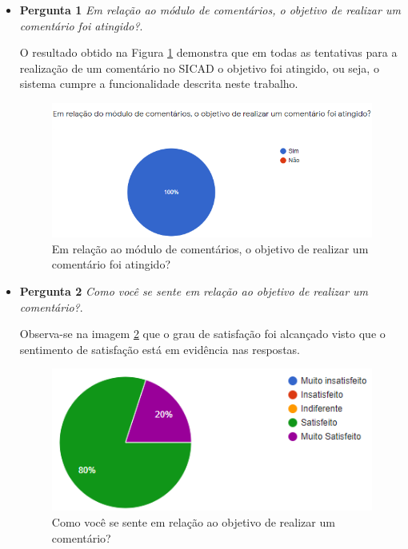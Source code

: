 \documentclass[12pt, a4paper]{report}
\begin{document}
\begin{itemize}
\item{\textbf{ Pergunta 1}}
\textit{Em relação ao módulo de comentários, o objetivo de realizar um comentário foi atingido?}.

O resultado obtido na Figura \ref{fig:grafico_pergunta1} demonstra que em todas as tentativas para a realização de um comentário no SICAD o objetivo foi atingido, ou seja, o sistema cumpre a funcionalidade descrita neste trabalho.

\begin{figure}
\centering
\includegraphics[scale=0.8]{grafico_pergunta1.png}
\caption{Em relação ao módulo de comentários, o objetivo de realizar um comentário foi atingido?}
\label{fig:grafico_pergunta1}
\end{figure}

\item{\textbf{ Pergunta 2}}
\textit{Como você se sente em relação ao objetivo de realizar um comentário?}.


Observa-se na imagem \ref{fig:grafico_pergunta2} que o grau de satisfação foi alcançado visto que o sentimento de satisfação está em evidência nas respostas.

\begin{figure}
\centering
\includegraphics[scale=0.8]{grafico_pergunta2.png}
\caption{Como você se sente em relação ao objetivo de realizar um comentário?}
\label{fig:grafico_pergunta2}
\end{figure}


\end{itemize}
\end{document}
